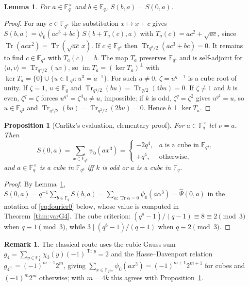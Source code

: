 \documentclass[11pt,a4paper]{amsart}
\newtheorem{proposition}[theorem]{Proposition}
\newtheorem{lemma}[theorem]{Lemma}
\theoremstyle{definition}
\newtheorem{remark}[theorem]{Remark}
\newcommand{\F}{\mathbb{F}}
\newcommand{\Tr}{\operatorname{Tr}}
\newcommand{\im}{\operatorname{im}}
\begin{document}
\begin{lemma}\label{lem:lambda1}
For $a\in\F_q^\times$ and $b\in\F_q$, $S(b,a)=S(0,a)$.
\end{lemma}
\begin{proof}
For any $c\in\F_{q^8}$ the substitution $x\mapsto x+c$ gives $S(b,a)=\psi_0(ac^3+bc)\,S(b+T_a(c),a)$ with $T_a(c)=ac^2+\sqrt{ac}$, since $\Tr(acx^2)=\Tr(\sqrt{ac}\,x)$. If $c\in\F_{q^4}$ then $\Tr_{q^8/2}(ac^3+bc)=0$. It remains to find $c\in\F_{q^4}$ with $T_a(c)=b$. The map $T_a$ preserves $\F_{q^4}$ and is self-adjoint for $\langle u,v\rangle=\Tr_{q^4/2}(uv)$, so $\im T_a=(\ker T_a)^\perp$ with $\ker T_a=\{0\}\cup\{u\in\F_{q^4}:u^3=a^{-1}\}$. For such $u\ne0$, $\zeta=u^{q-1}$ is a cube root of unity. If $\zeta=1$, $u\in\F_q$ and $\Tr_{q^4/2}(bu)=\Tr_{q/2}(4bu)=0$. If $\zeta\ne1$ and $k$ is even, $\zeta^q=\zeta$ forces $u^{q^4}=\zeta^4u\ne u$, impossible; if $k$ is odd, $\zeta^q=\zeta^2$ gives $u^{q^2}=u$, so $u\in\F_{q^2}$ and $\Tr_{q^4/2}(bu)=\Tr_{q^2/2}(2bu)=0$. Hence $b\perp\ker T_a$.
\end{proof}

\begin{proposition}[Carlitz's evaluation, elementary proof]\label{prop:carlitz}
For $a\in\F_q^\times$ let $\nu=a$. Then
\[
S(0,a)=\sum_{x\in\F_{q^8}}\psi_0(ax^3)=\begin{cases}-2q^4,&\text{$a$ is a cube in }\F_{q^8},\\ +q^4,&\text{otherwise,}\end{cases}
\]
and $a\in\F_q^\times$ is a cube in $\F_{q^8}$ iff $k$ is odd or $a$ is a cube in $\F_q$.
\end{proposition}
\begin{proof}
By Lemma~\ref{lem:lambda1}, $S(0,a)=q^{-1}\sum_{b\in\F_q}S(b,a)=\sum_{\alpha:\Tr\alpha=0}\psi_0(a\alpha^3)=\widehat\Psi(0,a)$ in the notation of \eqref{eq:fourier0} below, whose value is computed in Theorem~\ref{thm:varG4}. The cube criterion: $(q^8-1)/(q-1)\equiv8\equiv2\pmod3$ when $q\equiv1\pmod3$, while $3\mid(q^8-1)/(q-1)$ when $q\equiv2\pmod3$.
\end{proof}

\begin{remark}
\begin{sloppypar}
The classical route \cite{Carlitz} uses the cubic Gauss sum $g_4=\sum_{y\in\F_4^\times}\chi_3(y)(-1)^{\Tr y}=2$ and the Hasse--Davenport relation \cite{HD} $g_{4^m}=(-1)^{m-1}2^m$, giving $\sum_{x\in\F_{2^{2m}}}\psi_0(ax^3)=(-1)^{m+1}2^{m+1}$ for cubes and $(-1)^m2^m$ otherwise; with $m=4k$ this agrees with Proposition~\ref{prop:carlitz}.
\end{sloppypar}
\end{remark}
\end{document}

